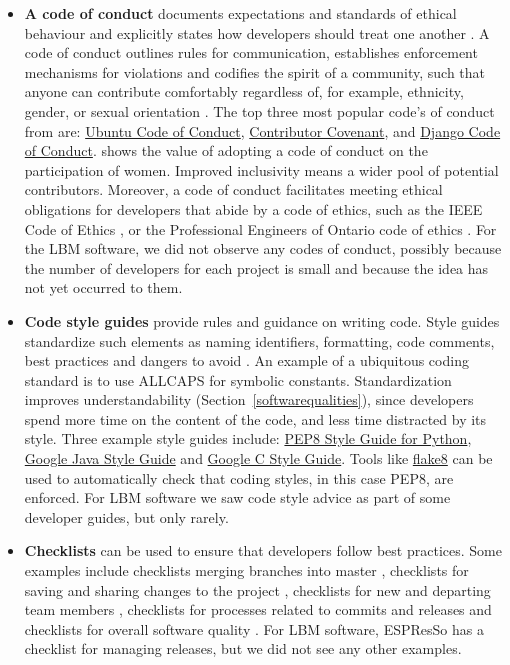 \documentclass[final, 3p, times, authoryear]{elsarticle}
\newcommand{\CC}{C\nolinebreak\hspace{-.05em}\raisebox{.4ex}{\small\bf
+}\nolinebreak\hspace{-.10em}\raisebox{.4ex}{\small\bf +}}
\begin{document}
\begin{itemize}
\item \textbf{A code of conduct} documents expectations and standards of ethical
behaviour and explicitly states how developers should treat one another
\citep{TouraniEtAl2017}. A code of conduct outlines rules for communication,
establishes enforcement mechanisms for violations and codifies the spirit of a
community, such that anyone can contribute comfortably regardless of, for
example, ethnicity, gender, or sexual orientation \citep{TouraniEtAl2017}. The
top three most popular code's of conduct from \citet{TouraniEtAl2017} are:
\href{https://ubuntu.com/community/code-of-conduct} {Ubuntu Code of Conduct},
\href{https://www.contributor-covenant.org/version/2/1/code_of_conduct/}
{Contributor Covenant}, and \href{https://www.djangoproject.com/conduct/}
{Django Code of Conduct}. \citet{SinghEtAl2021} shows the value of adopting a
code of conduct on the participation of women. Improved inclusivity means a
wider pool of potential contributors. Moreover, a code of conduct facilitates
meeting ethical obligations for developers that abide by a code of ethics, such
as the IEEE Code of Ethics \citep{IEEE1999}, or the Professional Engineers of
Ontario code of ethics \citep[p.\ 23--24]{PEO2021}. For the LBM software, we did
not observe any codes of conduct, possibly because the number of developers for
each project is small and because the idea has not yet occurred to them.

\item \textbf{Code style guides} provide rules and guidance on writing code.
Style guides standardize such elements as naming identifiers, formatting, code
comments, best practices and dangers to avoid \citep{Carty2020}. An example of a
ubiquitous coding standard is to use ALLCAPS for symbolic constants.
Standardization improves understandability (Section~\ref{softwarequalities}),
since developers spend more time on the content of the code, and less time
distracted by its style.  Three example style guides include:
\href{http://cnl.sogang.ac.kr/cnlab/lectures/programming/python/PEP8_Style_Guide.pdf}
{PEP8 Style Guide for Python},
\href{https://google.github.io/styleguide/javaguide.html} {Google Java Style
Guide} and \href{https://google.github.io/styleguide/cppguide.html} {Google \CC
Style Guide}.  Tools like \href{https://pypi.org/project/flake8/}{flake8} can be
used to automatically check that coding styles, in this case PEP8, are enforced.
For LBM software we saw code style advice as part of some developer guides, but
only rarely.

\item \textbf{Checklists} can be used to ensure that developers follow best
practices.  Some examples include checklists merging branches into master
\citep{Brown2015}, checklists for saving and sharing changes to the project
\citep{WilsonEtAl2016}, checklists for new and departing team members
\citep{HerouxAndBernholdt2018}, checklists for processes related to commits and
releases \citep{HerouxEtAl2008} and checklists for overall software quality
\citep{ThielEtAl2020, SSI2022}.  For LBM software, ESPResSo has a checklist for
managing releases, but we did not see any other examples.


\end{itemize}
\end{document}
